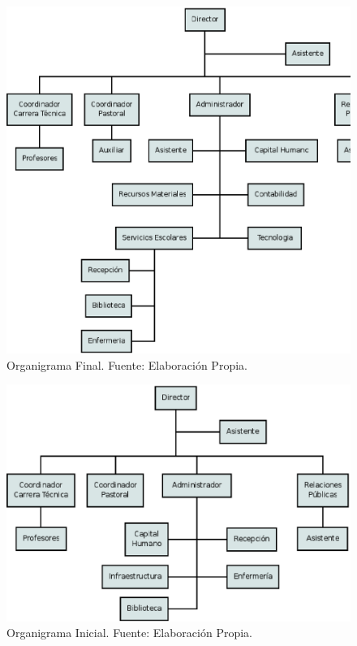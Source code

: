 \begin{figure}
	\centering
	\includegraphics[scale=0.7]{images/organigrama-final}
	\caption{Organigrama Final. Fuente: Elaboración Propia.}
	\label{fig:Org:Final}
\end{figure}

\begin{figure}
	\centering
	\includegraphics[scale=0.7]{images/organigrama-inicial}
	\caption{Organigrama Inicial. Fuente: Elaboración Propia.}
	\label{fig:Org:Inicial}
\end{figure}

